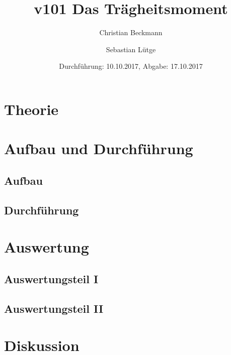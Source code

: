 \documentclass[
  titlepage=firstiscover,
]{scrartcl}
\title{v101 Das Trägheitsmoment}
\author{Christian Beckmann \and Sebastian Lütge}
\date{Durchführung: 10.10.2017, Abgabe: 17.10.2017}
\begin{document}
\maketitle
\tableofcontents
\newpage

\section{Theorie}

\section{Aufbau und Durchführung}

\subsection{Aufbau}
\subsection{Durchführung}

\section{Auswertung}

\subsection{Auswertungsteil I}
\subsection{Auswertungsteil II}

\section{Diskussion}
\end{document}
